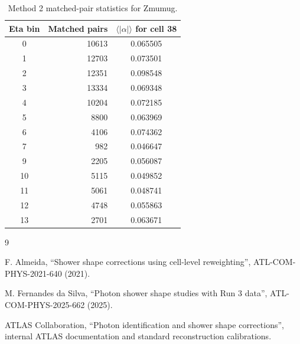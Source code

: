 \documentclass[11pt,a4paper]{article}
\begin{document}
\begin{table}[H]
\centering
\caption{Method 2 matched-pair statistics for Zmumug.}
\begin{tabular}{crc}
\toprule
Eta bin & Matched pairs & $\langle |\alpha| \rangle$ for cell 38 \\
\midrule
0 & 10613 & 0.065505 \\
1 & 12703 & 0.073501 \\
2 & 12351 & 0.098548 \\
3 & 13334 & 0.069348 \\
4 & 10204 & 0.072185 \\
5 & 8800 & 0.063969 \\
6 & 4106 & 0.074362 \\
7 & 982 & 0.046647 \\
9 & 2205 & 0.056087 \\
10 & 5115 & 0.049852 \\
11 & 5061 & 0.048741 \\
12 & 4748 & 0.055863 \\
13 & 2701 & 0.063671 \\
\bottomrule
\end{tabular}
\end{table}

\begin{thebibliography}{9}

F. Almeida, ``Shower shape corrections using cell-level reweighting'',
ATL-COM-PHYS-2021-640 (2021).

M. Fernandes da Silva, ``Photon shower shape studies with Run 3 data'',
ATL-COM-PHYS-2025-662 (2025).

ATLAS Collaboration, ``Photon identification and shower shape corrections'',
internal ATLAS documentation and standard reconstruction calibrations.

\end{thebibliography}
\end{document}
